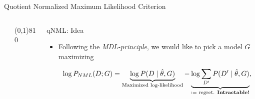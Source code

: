 \documentclass[final]{beamer}
\newcommand{\heading}[1]{\alert{\large #1}\\}
\theoremstyle{plain}
\begin{document}
\begin{frame}{}
\begin{block}{Quotient Normalized Maximum Likelihood Criterion}
\begin{columns}[T]
\begin{column}{0.34\textwidth}
\begin{minipage}{0.49\textwidth}
   		\end{minipage}
   		
   		\vspace*{12pt}
   		
		
  
   	\end{column}
   
   \begin{column}{0.005\textwidth}\linethickness{0.3ex} %
      \color{myPurple} \line(0,1){810}
   \end{column} %
   
   \begin{column}{0.3\textwidth} %
	\heading{qNML: Idea}
	\vspace*{12pt}
	\begin{itemize}
	\item Following the \textit{MDL-principle}, we would like to pick a model $G$ maximizing

	\begin{equation}
	\log P_{NML}(D;G) = \underbrace{\log P(D \mid \hat\theta , G)}_{\text{Maximized log-likelihood}} - \underbrace{\log \sum_{D'}P(D' \mid \hat  \theta,G)}_{:= \text{ regret. } \textbf{Intractable!}}, \notag
	\end{equation}%


\end{itemize}
\end{column}
\end{columns}
\end{block}
\end{frame}
\end{document}

